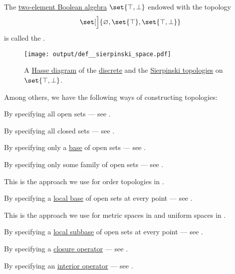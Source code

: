 \begin{definition}\label{def:sierpinski_space}
  The \hyperref[def:boolean_algebra/trivial]{two-element Boolean algebra} \( \set{ \top, \bot } \) endowed with the topology
  \begin{equation*}
    \set[\Big]{ \varnothing, \set{ \top }, \set{ \top, \bot } }
  \end{equation*}
  is called the .

  \begin{figure}[!ht]
    \hfill
    \texttt{[image: output/def\_\_sierpinski\_space.pdf]}
    \hfill\hfill
    \caption{A \hyperref[def:hasse_diagram]{Hasse diagram} of the \hyperref[def:discrete_topology]{discrete} and the \hyperref[def:sierpinski_space]{Sierpinski topologies} on \( \set{ \top, \bot } \). }
    \label{fig:def:sierpinski_space}
  \end{figure}
\end{definition}

\begin{remark}\label{rem:constructing_topologies}
  Among others, we have the following ways of constructing topologies:
  \begin{thmenum}
     By specifying all open sets --- see .

     By specifying all closed sets --- see .

     By specifying only a \hyperref[def:topological_base]{base} of open sets --- see .

     By specifying only some family of open sets --- see .

    This is the approach we use for order topologies in .

     By specifying a \hyperref[def:topological_local_base]{local base} of open sets at every point --- see .

    This is the approach we use for metric spaces in  and uniform spaces in .

     By specifying a \hyperref[def:topological_local_subbase]{local subbase} of open sets at every point --- see .

     By specifying a \hyperref[def:topological_closure_operator]{closure operator} --- see .

     By specifying an \hyperref[def:topological_interior_operator]{interior operator} --- see .
  \end{thmenum}
\end{remark}

